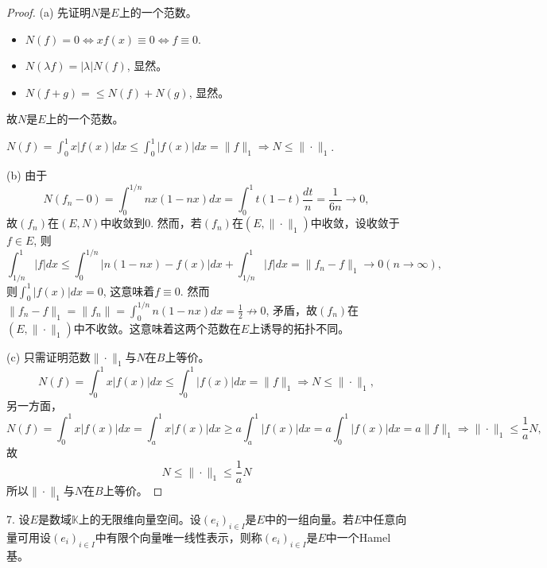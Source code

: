 \documentclass[a4paper,8pt]{ctexart}\textwidth 140mm \textheight 216mm
\newcommand{\8}{\infty}
\begin{document}
\begin{proof}
	(a) 先证明$N$是$E$上的一个范数。
	\begin{itemize}
		\item $N(f)=0\Leftrightarrow xf(x)\equiv0\Leftrightarrow f\equiv 0$.
		\item $N(\lambda f)=|\lambda|N(f)$, 显然。
		\item $N(f+g)=\leq N(f)+N(g)$, 显然。
	\end{itemize}
	故$N$是$E$上的一个范数。
	
	$N(f)=\int_0^1 x|f(x)|dx\leq \int_0^1 |f(x)|dx=\|f\|_1\Rightarrow N\leq \|\cdot\|_1$.
	
	(b) 由于
	$$N(f_n-0)=\int_0^{1/n} nx(1-nx)dx=\int_0^1 t(1-t)\frac{dt}{n}=\frac{1}{6n}\to 0,$$
	故$(f_n)$在$(E,N)$中收敛到0. 然而，若$(f_n)$在$(E,\|\cdot\|_1)$中收敛，设收敛于$f\in E$, 则
	$$\int_{1/n}^1|f|dx\leq \int_0^{1/n}|n(1-nx)-f(x)|dx+\int_{1/n}^1|f|dx=\|f_n-f\|_1\to 0(n\to\infty),$$
	则$\int_0^1 |f(x)|dx=0$, 这意味着$f\equiv0$. 然而$\|f_n-f\|_1=\|f_n\|=\int_0^{1/n}n(1-nx)dx=\frac{1}{2}\nrightarrow 0$, 矛盾，故$(f_n)$在$(E,\|\cdot\|_1)$中不收敛。这意味着这两个范数在$E$上诱导的拓扑不同。
	
	(c) 只需证明范数$\|\cdot\|_1$与$N$在$B$上等价。
	$$N(f)=\int_0^1 x|f(x)|dx\leq \int_0^1 |f(x)|dx=\|f\|_1\Rightarrow N\leq \|\cdot\|_1,$$
	另一方面，
	$$N(f)=\int_0^1 x|f(x)|dx=\int_a^1 x|f(x)|dx\geq a\int_a^1 |f(x)|dx=a\int_0^1 |f(x)|dx=a\|f\|_1\Rightarrow \|\cdot\|_1\leq \frac{1}{a}N,$$
	故
	$$N\leq \|\cdot\|_1\leq \frac{1}{a}N$$
	所以$\|\cdot\|_1$与$N$在$B$上等价。
\end{proof}



7. 设$E$是数域$\mathbb{K}$上的无限维向量空间。设$(e_i)_{i\in I}$是$E$中的一组向量。若$E$中任意向量可用设$(e_i)_{i\in I}$中有限个向量唯一线性表示，则称$(e_i)_{i\in I}$是$E$中一个Hamel基。
\end{document}
